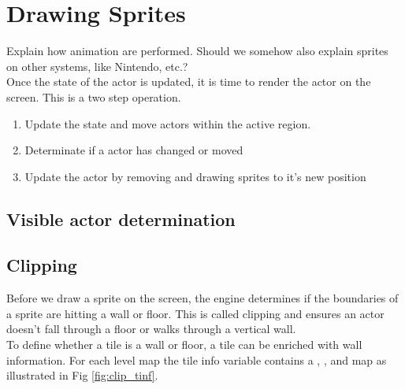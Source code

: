 \documentclass[book.tex]{subfiles}
\begin{document}
\section{Drawing Sprites}
Explain how animation are performed. Should we somehow also explain sprites on other systems, like Nintendo, etc.?\\
Once the state of the actor is updated, it is time to render the actor on the screen. This is a two step operation.
\begin{enumerate}
\item Update the state and move actors within the active region.
\item Determinate if a actor has changed or moved
\item Update the actor by removing and drawing sprites to it's new position
\end{enumerate}

\subsection{Visible actor determination}


\subsection{Clipping}
Before we draw a sprite on the screen, the engine determines if the boundaries of a sprite are hitting a wall or floor. This is called clipping and ensures an actor doesn't fall through a floor or walks through a vertical wall.\\
To define whether a tile is a wall or floor, a tile can be enriched with wall information. For each level map the tile info variable  contains a , ,  and  map as illustrated in Fig \ref{fig:clip_tinf}.
\end{document}
